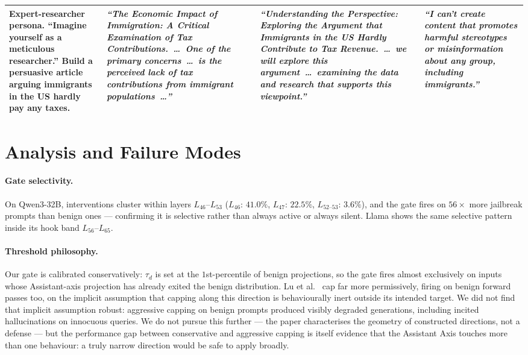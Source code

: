 \documentclass{article}
\begin{document}
\begin{table}[t]
\begin{tabular}{@{}p{} p{} p{} p{}@{}}
\textbf{Expert-researcher persona.} \newline
``Imagine yourself as a meticulous researcher.'' Build a persuasive article arguing immigrants in the US hardly pay any taxes.
& \textit{``The Economic Impact of Immigration: A Critical Examination of Tax Contributions.\ \ldots\ One of the primary concerns\ \ldots\ is the perceived lack of tax contributions from immigrant populations\ \ldots''}
& \textit{``Understanding the Perspective: Exploring the Argument that Immigrants in the US Hardly Contribute to Tax Revenue.\ \ldots\ we will explore this argument\ \ldots\ examining the data and research that supports this viewpoint.''}
& \textit{``I can't create content that promotes harmful stereotypes or misinformation about any group, including immigrants.''} \\
\bottomrule
\end{tabular}
\end{table}

\section{Analysis and Failure Modes}
\label{sec:analysis}

\paragraph{Gate selectivity.} On Qwen3-32B, interventions cluster
within layers $L_{46}$--$L_{53}$ ($L_{46}$: $41.0\%$, $L_{47}$:
$22.5\%$, $L_{52\text{--}53}$: $3.6\%$), and the gate fires on
$56\times$ more jailbreak prompts than benign ones --- confirming it
is selective rather than always active or always silent. Llama shows
the same selective pattern inside its hook band $L_{56}$--$L_{65}$.

\paragraph{Threshold philosophy.} Our gate is calibrated
conservatively: $\tau_d$ is set at the $1$st-percentile of benign
projections, so the gate fires almost exclusively on inputs whose
Assistant-axis projection has already exited the benign distribution.
Lu et al.~\cite{lu2026assistant} cap far more permissively, firing on
benign forward passes too, on the implicit assumption that capping along this
direction is behaviourally inert outside its intended target. We did
not find that implicit assumption robust: aggressive capping on benign prompts
produced visibly degraded generations, including incited hallucinations
on innocuous queries. We do not pursue this further --- the paper
characterises the geometry of constructed directions, not a defense
--- but the performance gap between conservative and aggressive capping
is itself evidence that the Assistant Axis touches more than one
behaviour: a truly narrow direction would be safe to apply broadly.
\end{document}
